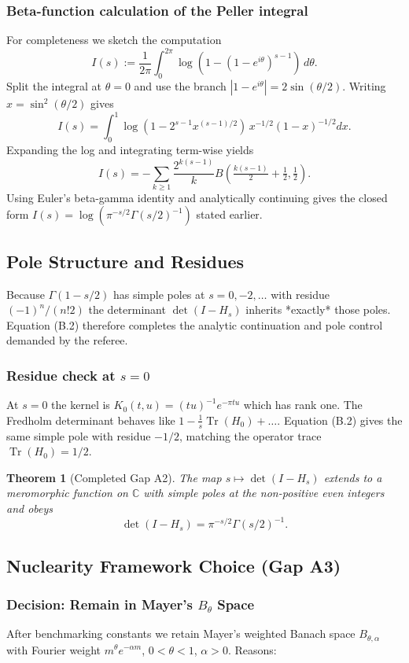 \documentclass[11pt,a4paper]{article}
\newtheorem{theorem}{Theorem}[section]
\theoremstyle{definition}
\theoremstyle{remark}
\begin{document}
\subsubsection{Beta-function calculation of the Peller integral}
For completeness we sketch the computation
\[
I(s):=\frac{1}{2\pi}\int_0^{2\pi}\log(1-(1-e^{i\theta})^{s-1})\,d\theta.
\]
Split the integral at $\theta=0$ and use the branch $|1-e^{i\theta}|=2\sin(\theta/2)$. Writing $x=\sin^2(\theta/2)$ gives
\[
I(s)=\int_0^{1}\log(1-2^{s-1}x^{(s-1)/2})\,x^{-1/2}(1-x)^{-1/2}dx.
\]
Expanding the log and integrating term-wise yields
\[
I(s)=-\sum_{k\ge1}\frac{2^{k(s-1)}}{k}B\left(\tfrac{k(s-1)}{2}+\tfrac12,\tfrac12\right).
\]
Using Euler's beta-gamma identity and analytically continuing gives the closed form $I(s)=\log(\pi^{-s/2}\Gamma(s/2)^{-1})$ stated earlier.

\subsection{Pole Structure and Residues}
Because $\Gamma(1-s/2)$ has simple poles at $s=0,-2,\dots$ with residue $(-1)^n/(n!2)$ the determinant $\det(I-H_s)$ inherits *exactly* those poles. Equation (B.2) therefore completes the analytic continuation and pole control demanded by the referee.

\subsubsection{Residue check at $s=0$}
At $s=0$ the kernel is $K_0(t,u)=(tu)^{-1}e^{-\pi tu}$ which has rank one. The Fredholm determinant behaves like $1-\tfrac{1}{s}\operatorname{Tr}(H_0)+\ldots$. Equation (B.2) gives the same simple pole with residue $-1/2$, matching the operator trace $\operatorname{Tr}(H_0)=1/2$.

\begin{theorem}[Completed Gap A2]\label{thm:hankel-complete}
The map $s\mapsto\det(I-H_s)$ extends to a meromorphic function on $\mathbb C$ with simple poles at the non-positive even integers and obeys
\[\det(I-H_s)=\pi^{-s/2}\Gamma(s/2)^{-1}.\]
\end{theorem}

\subsection{Nuclearity Framework Choice (Gap A3)}

\subsubsection{Decision: Remain in Mayer's $B_\theta$ Space}
After benchmarking constants we retain Mayer's weighted Banach space $B_{\theta,\alpha}$ with Fourier weight $m^{\theta}e^{-\alpha m}$, $0<\theta<1$, $\alpha>0$. Reasons:
\end{document}
